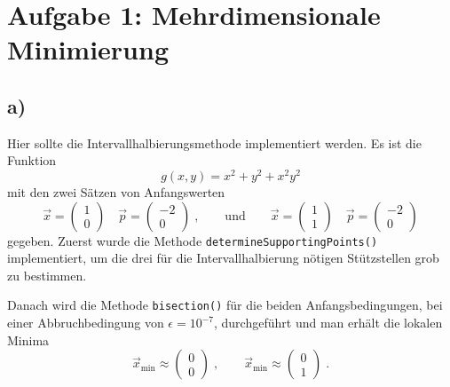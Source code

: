 \newpage
\section{Aufgabe 1: Mehrdimensionale Minimierung}
\label{sec:auf1}

\subsection{a)}
    Hier sollte die Intervallhalbierungsmethode implementiert werden.
    Es ist die Funktion
    \begin{equation}
        g(x, y) = x^2 + y^2 + x^2 y^2
    \end{equation}
    mit den zwei Sätzen von Anfangswerten
    \begin{equation}
        \vec{x} =
        \begin{pmatrix}
            1 \\ 0
        \end{pmatrix} \quad
        \vec{p} =
        \begin{pmatrix}
            -2 \\ 0
        \end{pmatrix} \;, \qquad \mathrm{und} \qquad
        \vec{x} =
        \begin{pmatrix}
            1 \\ 1
        \end{pmatrix} \quad
        \vec{p} =
        \begin{pmatrix}
            -2 \\ 0
        \end{pmatrix}
    \end{equation}
    gegeben.
    Zuerst wurde die Methode \verb|determineSupportingPoints()| implementiert, um die drei für die Intervallhalbierung nötigen Stützstellen grob zu bestimmen.

    Danach wird die Methode \verb|bisection()| für die beiden Anfangsbedingungen, bei einer Abbruchbedingung von $\epsilon = 10^{-7}$, durchgeführt und man erhält die lokalen Minima
    \begin{equation}
        \vec{x}_{\mathrm{min}} \approx 
        \begin{pmatrix}
            0 \\ 0
        \end{pmatrix} \; , \qquad
        \vec{x}_{\mathrm{min}} \approx 
        \begin{pmatrix}
            0 \\ 1
        \end{pmatrix} \; .
    \end{equation}
    


